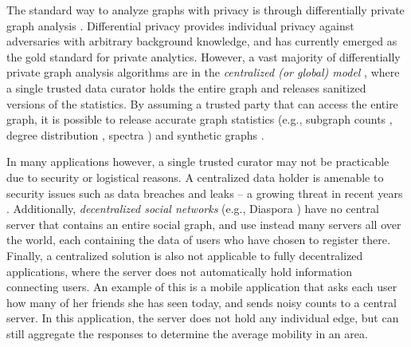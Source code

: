 The standard way to analyze graphs with privacy is through differentially private graph analysis \cite{Raskhodnikova_Encyclopedia16,DP,Dwork_ICALP06}. 
Differential privacy 
provides individual privacy against adversaries with arbitrary background knowledge, and has currently emerged as the gold standard for private analytics. 
However, a vast majority of differentially private graph analysis algorithms are in the \textit{centralized (or global) model} \cite{blocki2012johnson,Chen_PoPETs20,Day_SIGMOD16,Hay_ICDM09,Karwa_PVLDB11,Kasiviswanathan_TCC13,Nissim_STOC07,Raskhodnikova_arXiv15,Raskhodnikova_Encyclopedia16,Song_arXiv18,Wang_PAKDD13,Wang_TDP13}, where a single trusted data curator holds the entire graph and releases sanitized versions of the statistics. 
By assuming a trusted party that can access the entire graph, 
it is possible to release accurate graph statistics 
(e.g., subgraph counts \cite{Karwa_PVLDB11,Kasiviswanathan_TCC13,Song_arXiv18}, degree distribution \cite{Day_SIGMOD16,Hay_ICDM09,Raskhodnikova_arXiv15}, spectra \cite{Wang_PAKDD13}) 
and synthetic graphs \cite{Chen_PoPETs20,Wang_TDP13}. 

In many applications however, a single trusted curator may not be practicable due to security or logistical reasons. A centralized data holder is amenable to security issues such as data breaches and leaks -- a growing threat in recent years \cite{data_breach1,data_breach2}. Additionally, \textit{decentralized social networks} \cite{Paul_CN14,Salve_CSR18} (e.g., Diaspora \cite{Diaspora}) have no central server that contains an entire social graph, and use instead many servers all over the world, each containing the data of users who have chosen to register there.  Finally, a centralized solution is also not applicable to fully decentralized applications, where the server does not automatically hold information connecting users. An example of this is a mobile application that asks each user how many of 
her 
friends 
she has 
seen today, and sends noisy counts to a central server. In this application, the server does not hold any individual edge, but can still aggregate the responses to determine the average mobility in an area. 

